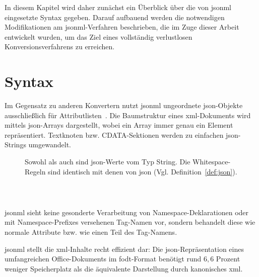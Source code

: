 In diesem Kapitel wird daher zunächst ein Überblick über die von \acrshort{jsonml} eingesetzte Syntax gegeben.
Darauf aufbauend werden die notwendigen Modifikationen am \acrshort{jsonml}-Verfahren beschrieben, die im Zuge dieser Arbeit entwickelt wurden, um das Ziel eines vollständig verlustlosen Konversionsverfahrens zu erreichen.

\section{Syntax}
\label{sec:jsonml-syntax}

Im Gegensatz zu anderen Konvertern nutzt \acrshort{jsonml} ungeordnete \acrshort{json}-Objekte ausschließlich für Attributlisten~\cite{jsonmlsyntax}. Die Baumstruktur eines \acrshort{xml}-Dokuments wird mittels \acrshort{json}-Arrays dargestellt, wobei ein Array immer genau ein Element repräsentiert. Textknoten bzw. CDATA-Sektionen werden zu einfachen \acrshort{json}-Strings umgewandelt.

\begin{figure}[H]
    \begin{definition}
        \label{def:jsonml}
        Sowohl  als auch  sind \acrshort{json}-Werte vom Typ String. Die Whitespace-Regeln sind identisch mit denen von \acrshort{json} (Vgl. Definition~\ref{def:json}).
        \begin{grammar}
            
        \end{grammar}
    \end{definition}
\end{figure}

\begin{figure}[h]
    \begin{example}~
    \inputminted{json}{xmltree.json}
    \label{fig:xmltreejsonml}
    \end{example}
\end{figure}

\acrshort{jsonml} sieht keine gesonderte Verarbeitung von Namespace-Deklarationen oder mit Namespace-Prefixes versehenen Tag-Namen vor, sondern behandelt diese wie normale Attribute bzw. wie einen Teil des Tag-Namens.

\acrshort{jsonml} stellt die \acrshort{xml}-Inhalte recht effizient dar: Die \acrshort{json}-Repräsentation eines umfangreichen Office-Dokuments im \acrshort{fodt}-Format benötigt rund $6,6$ Prozent weniger Speicherplatz als die äquivalente Darstellung durch kanonisches \acrshort{xml}.

